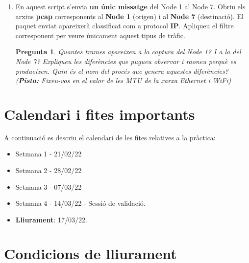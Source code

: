 \documentclass[12pt,a4paper]{article}
\newcounter{exercises}
\newtheorem{exer}[exercises]{Pregunta}
\begin{document}
\begin{enumerate}
\item En aquest script s'envia \textbf{un únic missatge} del Node 1 al Node 7. Obriu els arxius \textbf{pcap} corresponents al \textbf{Node 1} (origen) i al \textbf{Node 7} (destinació). El paquet enviat apareixerà classificat com a protocol \textbf{IP}. Apliqueu el filtre corresponent per veure únicament aquest tipus de tràfic.

\begin{exer} Quantes trames apareixen a la captura del Node 1? I a la del Node 7? Expliqueu les diferències que pugueu observar i raoneu perquè es produeixen. Quin és el nom del procés que genera aquestes diferències? (\textbf{Pista:} Fixeu-vos en el valor de les MTU de la xarxa Ethernet i WiFi) \end{exer}

\end{enumerate}




\section{Calendari i fites importants}

A continuació es descriu el calendari de les fites relatives a la pràctica:
\begin{itemize}
    
    \item Setmana 1 - 21/02/22 
    \item Setmana 2 - 28/02/22 
    \item Setmana 3 - 07/03/22 
    \item Setmana 4 - 14/03/22 - Sessió de validació.
    \item \textbf{Lliurament}: 17/03/22.
\end{itemize}

\section{Condicions de lliurament}
\end{document}
